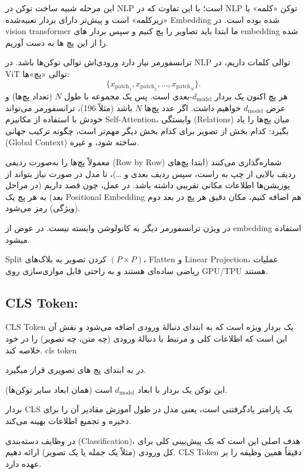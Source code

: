 این مرحله شبیه ساخت توکن در NLP است؛ با این تفاوت که در NLP توکن «کلمه» یا «زیرکلمه» است و پیش‌تر دارای بردار تعبیه‌شده Embedding شده بوده است. در vision transformer  ما ابتدا باید تصاویر را پچ کنیم و سپس بردار های embedding  شده را از این پچ ها به دست آوریم. 

ترانسفورمر نیاز دارد ورودی‌اش توالی توکن‌ها باشد. در NLP توالی کلمات داریم، در ViT توالی «پچ»‌ها:
\[
\{ x_{\text{patch}_1}, x_{\text{patch}_2}, \dots, x_{\text{patch}_N} \}.
\]
هر پچ اکنون یک بردار \(d_{\text{model}}\)-بعدی است. پس یک مجموعه با طول \(N\) (تعداد پچ‌ها) و عرض \(d_{\text{model}}\) خواهیم داشت.
اگر عدد پچ‌ها \(N\) باشد (مثلاً 196)، ترانسفورمر می‌تواند خودش با استفاده از مکانیزم Self-Attention، وابستگی (Relations) میان پچ‌ها را یاد بگیرد: کدام بخش از تصویر برای کدام بخش دیگر مهم‌تر است، چگونه ترکیب جهانی (Global Context) ساخته شود، و غیره.


معمولاً پچ‌ها را به‌صورت ردیفی (Row by Row) شماره‌گذاری می‌کنند (ابتدا پچ‌های ردیف بالایی از چپ به راست، سپس ردیف بعدی و …)، تا مدل در صورت نیاز بتواند از پوزیشن‌ها اطلاعات مکانی تقریبی داشته باشد.
در عمل، چون قصد داریم (در مراحل بعد) به هر پچ یک Positional Embedding هم اضافه کنیم، مکان دقیق هر پچ در بعد دوم (ویژگی) رمز می‌شود.

در ویژن ترانسفورمر دیگر به کانولوشن وابسته نیست.
در عوض از embedding  استفاده میشود.

Split کردن تصویر به بلاک‌های \((P \times P)\)، Flatten و Linear Projection، عملیات ریاضی ساده‌ای هستند و به راحتی قابل موازی‌سازی روی GPU/TPU هستند.


\subsection{CLS Token:}

CLS Token یک بردار ویژه است که به ابتدای دنبالهٔ ورودی اضافه می‌شود و نقش آن این است که اطلاعات کلی و مرتبط با دنبالهٔ ورودی (چه متن، چه تصویر) را در خود خلاصه کند.  
cls token 


در به ابتدای پج های تصویری قرار میگیرد.

   این توکن یک بردار با ابعاد $d_{\text{model}}$ است (همان ابعاد سایر توکن‌ها).
   
        بردار CLS یک پارامتر یادگرفتنی است، یعنی مدل در طول آموزش مقادیر آن را برای ذخیره و تجمیع اطلاعات بهینه می‌کند.
   


در وظایف دسته‌بندی (Classification)، هدف اصلی این است که یک پیش‌بینی کلی برای کل ورودی (مثلاً یک جمله یا یک تصویر) ارائه دهیم. CLS Token دقیقاً همین وظیفه را بر عهده دارد.


